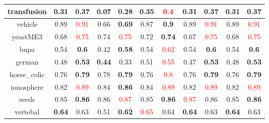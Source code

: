 \documentclass{article}%
\begin{document}
\begin{tabular}{c|cccccccccc}
\hline%
transfusion&0.31&\textbf{0.37}&0.07&\textbf{0.28}&0.35&\textcolor{red}{ 
0.4
}&0.31&\textbf{0.37}&0.31&\textbf{0.37}\\%
\hline%
vehicle&0.89&\textcolor{red}{ 
0.91
}&0.66&\textbf{0.69}&0.87&\textbf{0.9}&0.89&\textcolor{red}{ 
0.91
}&0.89&\textcolor{red}{ 
0.91
}\\%
\hline%
yeastME3&0.68&\textcolor{red}{ 
0.75
}&0.74&\textcolor{red}{ 
0.75
}&0.72&\textbf{0.74}&0.67&\textcolor{red}{ 
0.75
}&0.68&\textcolor{red}{ 
0.75
}\\%
\hline%
bupa&0.54&\textbf{0.6}&0.42&\textbf{0.58}&0.54&\textcolor{red}{ 
0.62
}&0.54&\textbf{0.6}&0.54&\textbf{0.6}\\%
\hline%
german&0.48&\textbf{0.53}&\textbf{0.44}&0.33&0.51&\textcolor{red}{ 
0.55
}&0.47&\textbf{0.53}&0.48&\textbf{0.53}\\%
\hline%
horse\_colic&0.76&\textbf{0.79}&0.78&\textbf{0.79}&0.76&\textcolor{red}{ 
0.8
}&0.76&\textbf{0.79}&0.76&\textbf{0.79}\\%
\hline%
ionosphere&0.82&\textcolor{red}{ 
0.89
}&0.84&\textbf{0.86}&0.84&\textcolor{red}{ 
0.89
}&0.82&\textcolor{red}{ 
0.89
}&0.82&\textcolor{red}{ 
0.89
}\\%
\hline%
seeds&0.85&\textbf{0.86}&0.86&\textcolor{red}{ 
0.87
}&0.85&\textbf{0.86}&\textcolor{red}{ 
0.87
}&0.86&0.85&\textbf{0.86}\\%
\hline%
vertebal&\textbf{0.64}&0.63&0.51&\textbf{0.62}&\textcolor{red}{ 
0.65
}&0.64&\textbf{0.64}&0.63&\textbf{0.64}&0.63\\%
\hline%
\end{tabular}

%
\end{document}
